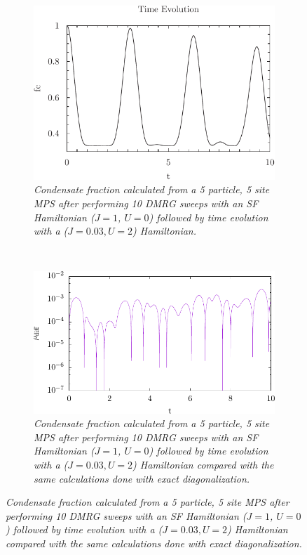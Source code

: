 \begin{figure}[h!]
    \centering
    \begin{subfigure}[t]{0.49\textwidth}
        \includegraphics[width=\textwidth]{Figures/TimeEvo5_U2_J0_03.pdf}
        \caption{\textit{Condensate fraction calculated from a 5 particle, 5 site MPS after performing 10 DMRG sweeps with an SF Hamiltonian ($J=1$, $U=0$) followed by time evolution with a ($J=0.03, U=2$) Hamiltonian.}}
        \label{fig:TimeEvo5_U2_J0_03}
    \end{subfigure}
    ~
    \begin{subfigure}[t]{0.49\textwidth}
        \includegraphics[width=\textwidth]{Figures/TimeEvo5_U2_J0_03_VS_ExactDiag.pdf}
        \caption{\textit{Condensate fraction calculated from a 5 particle, 5 site MPS after performing 10 DMRG sweeps with an SF Hamiltonian ($J=1$, $U=0$) followed by time evolution with a ($J=0.03, U=2$) Hamiltonian compared with the same calculations done with exact diagonalization.}}
        \label{fig:ExDiagComp_U2_J0_03}
    \end{subfigure}
\end{figure}

